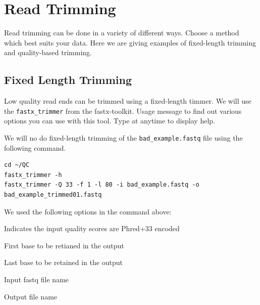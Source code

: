 \section{Read Trimming}
Read trimming can be done in a variety of different ways. Choose a method
which best suits your data. Here we are giving examples of fixed-length trimming
and quality-based trimming.

\subsection{Fixed Length Trimming}
Low quality read ends can be trimmed using a fixed-length timmer. We will use the
\texttt{fastx\_trimmer} from the fastx-toolkit. Usage message to find out various options
you can use with this tool. Type  at anytime to display help.

\begin{steps}
We will no do fixed-length trimming of the \texttt{bad\_example.fastq} file
using the following command.
\begin{lstlisting}
cd ~/QC
fastx_trimmer -h
fastx_trimmer -Q 33 -f 1 -l 80 -i bad_example.fastq -o bad_example_trimmed01.fastq
\end{lstlisting}
\end{steps}

\begin{note}
We used the following options in the command above:
\begin{description}[style=multiline,labelindent=0cm,align=right,leftmargin=\descriptionlabelspace,rightmargin=1.5cm,font=\ttfamily]
 \item[-Q 33] Indicates the input quality scores are Phred+33 encoded
 \item[-f] First base to be retianed in the output
 \item[-l] Last base to be retained in the output
 \item[-i] Input fastq file name
 \item[-o] Output file name
\end{description}
\end{note}

